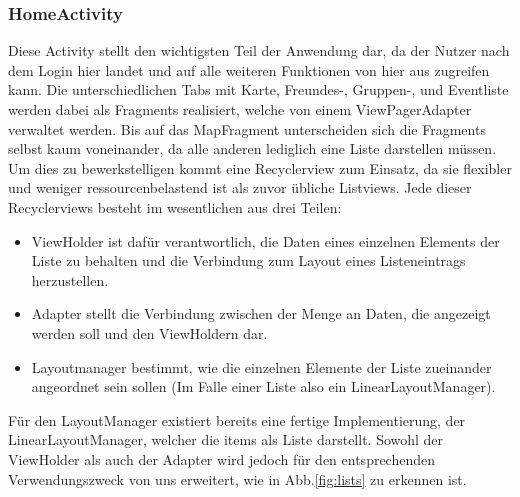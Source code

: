 \documentclass[parskip=full,11pt]{scrartcl}
\begin{document}
\subsubsection{HomeActivity}
Diese Activity stellt den wichtigsten Teil der Anwendung dar, da der Nutzer
nach dem Login hier landet und auf alle weiteren Funktionen von hier aus
zugreifen kann. Die unterschiedlichen Tabs mit Karte, Freundes-, Gruppen-, und
Eventliste werden dabei als Fragments realisiert, welche von einem
ViewPagerAdapter verwaltet werden. Bis auf das MapFragment unterscheiden sich
die Fragments selbst kaum voneinander, da alle anderen lediglich eine Liste
darstellen müssen. Um dies zu bewerkstelligen kommt eine Recyclerview zum
Einsatz, da sie flexibler und weniger ressourcenbelastend ist als zuvor
übliche Listviews. Jede dieser Recyclerviews besteht im wesentlichen aus
drei Teilen:
\begin{itemize}
	\item{ViewHolder} ist dafür verantwortlich, die Daten eines einzelnen
        Elements der Liste zu behalten und die Verbindung zum Layout eines
        Listeneintrags herzustellen.
	\item{Adapter} stellt die Verbindung zwischen der Menge an Daten, die
        angezeigt werden soll und den ViewHoldern dar.
	\item{Layoutmanager} bestimmt, wie die einzelnen Elemente der Liste
        zueinander angeordnet sein sollen
        (Im Falle einer Liste also ein LinearLayoutManager).
\end{itemize}
Für den LayoutManager existiert bereits eine fertige Implementierung, der
LinearLayoutManager, welcher die items als Liste darstellt. Sowohl der
ViewHolder als auch der Adapter wird jedoch für den entsprechenden
Verwendungszweck von uns erweitert, wie in Abb.\ref{fig:lists} zu erkennen ist.
\end{document}
